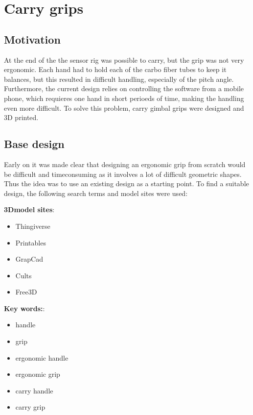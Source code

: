 \section{Carry grips}


\subsection{Motivation}
At the end of the \preproject the sensor rig was possible to carry, but the grip was not very ergonomic.
Each hand had to hold each of the carbo fiber tubes to keep it balances, but this resulted in difficult handling, especially of the pitch angle.
Furthermore, the current design relies on controlling the software from a mobile phone, which requieres one hand in short perioeds of time, making the handling even more difficult.
To solve this problem, carry gimbal grips were designed and 3D printed.


\subsection{Base design}
Early on it was made clear that designing an ergonomic grip from scratch would be difficult and timeconsuming as it involves a lot of difficult geometric shapes.
Thus the idea was to use an existing design as a starting point.
To find a suitable design, the following search terms and model sites were used:

\begin{multicols}{2}
    \textbf{3Dmodel sites}:
    \begin{itemize}
        \item Thingiverse
        \item Printables
        \item GrapCad
        \item Cults
        \item Free3D
    \end{itemize}
    \columnbreak
    \textbf{Key words:}:
    \begin{itemize}
        \item handle
        \item grip
        \item ergonomic handle
        \item ergonomic grip
        \item carry handle
        \item carry grip
    \end{itemize}
\end{multicols}

